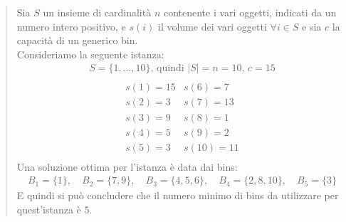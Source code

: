 \begin{quote}
	Sia $ S $ un insieme di cardinalità $ n $ contenente i vari oggetti, indicati da un numero intero positivo, e $ s(i) $
	il volume dei vari oggetti $ \forall i \in S $ e sia $ c $ la capacità di un generico bin. \\
	Consideriamo la seguente istanza:
	\begin{equation*}
		\begin{array}{c}
			S = \{1, ..., 10\} \text{, quindi } |S| = n = 10 \text{, } c = 15 \\
	    \end{array}
	\end{equation*}
	\begin{equation*}
	    \begin{array}{cc}
			s(1) = 15	&	s(6) = 7   \\
			s(2) = 3	&	s(7) = 13  \\
			s(3) = 9	&	s(8) = 1   \\
			s(4) = 5	&	s(9) = 2   \\
			s(5) = 3	&	s(10) = 11 \\
		\end{array}
	\end{equation*}
	Una soluzione ottima per l'istanza è data dai bins:
	\begin{align*}
		B_1 = \{1\} ,\quad B_2 = \{7, 9\} ,\quad B_3 = \{4, 5, 6\} ,\quad B_4 = \{2, 8, 10\} ,\quad B_5 = \{3\}
	\end{align*}
	E quindi si può concludere che il numero minimo di bins da utilizzare per quest'istanza è $ 5 $.
\end{quote}


